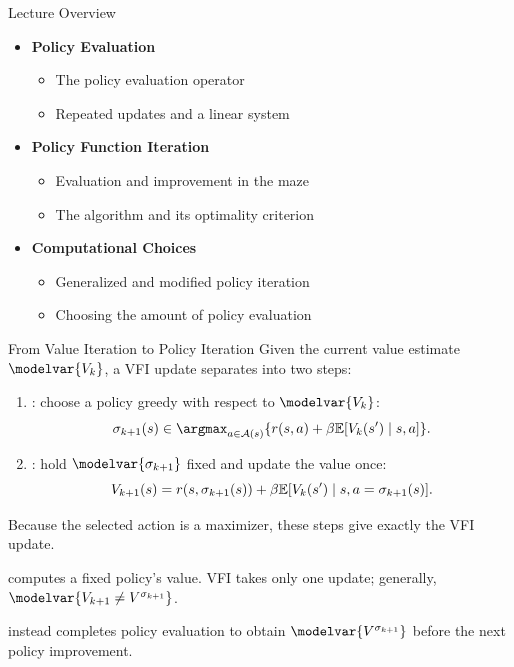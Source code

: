 \makecoursetitle

\begin{frame}{Lecture Overview}
\begin{itemize}
\item \textbf{Policy Evaluation}
  \begin{itemize}
  \item The policy evaluation operator
  \item Repeated updates and a linear system
  \end{itemize}
\item \textbf{Policy Function Iteration}
  \begin{itemize}
  \item Evaluation and improvement in the maze
  \item The algorithm and its optimality criterion
  \end{itemize}
\item \textbf{Computational Choices}
  \begin{itemize}
  \item Generalized and modified policy iteration
  \item Choosing the amount of policy evaluation
  \end{itemize}
\end{itemize}
\end{frame}

\begin{frame}{From Value Iteration to Policy Iteration}
\small
Given the current value estimate \(\modelvar{V_k}\), a VFI update separates into two steps:
\begin{enumerate}
\item {}: choose a policy greedy with respect to \(\modelvar{V_k}\):
\[
\sigma_{k+1}(s)\in\argmax_{a\in\Aset(s)}
\{r(s,a)+\beta\E[V_k(s')\mid s,a]\}.
\]
\item {}: hold \(\modelvar{\sigma_{k+1}}\) fixed and update the value once:
\[
V_{k+1}(s)=r(s,\sigma_{k+1}(s))
+\beta\mathbb E[V_k(s')\mid s,a=\sigma_{k+1}(s)].
\]
\end{enumerate}
Because the selected action is a maximizer, these steps give exactly the VFI update.
\par\medskip
{} computes a fixed policy's value. VFI takes only one update; generally, \(\modelvar{V_{k+1}\ne V^{\sigma_{k+1}}}\).
\par\medskip
{} instead completes policy evaluation to obtain \(\modelvar{V^{\sigma_{k+1}}}\) before the next policy improvement.
\end{frame}

